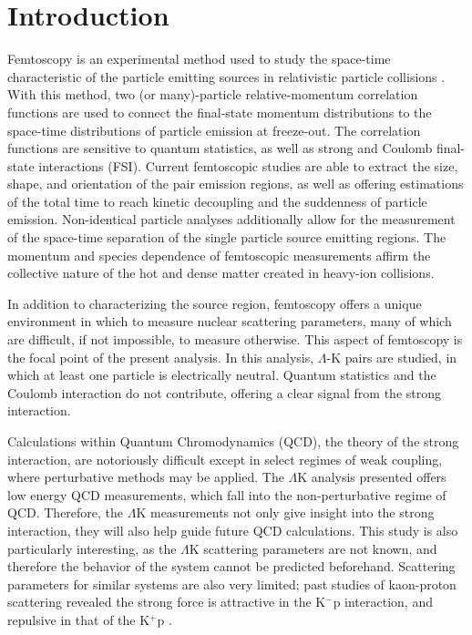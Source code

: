 \documentclass[ALICE,manyauthors]{cernphprep}
\newcommand{\Lam}{$\Lambda$\xspace}
\newcommand{\LamK}{$\Lambda$K\xspace}
\begin{document}
\section{Introduction}
\label{sec:Introduction}

Femtoscopy is an experimental method used to study the space-time characteristic of the particle emitting sources in relativistic particle collisions \cite{Lisa:2005dd}.  
With this method, two (or many)-particle relative-momentum correlation functions are used to connect the final-state momentum distributions to the space-time distributions of particle emission at freeze-out.  
The correlation functions are sensitive to quantum statistics, as well as strong and Coulomb final-state interactions (FSI).  
Current femtoscopic studies are able to extract the size, shape, and orientation of the pair emission regions, as well as offering estimations of the total time to reach kinetic decoupling and the suddenness of particle emission.
Non-identical particle analyses additionally allow for the measurement of the space-time separation of the single particle source emitting regions.
The momentum and species dependence of femtoscopic measurements affirm the collective nature of the hot and dense matter created in heavy-ion collisions.

In addition to characterizing the source region, femtoscopy offers a unique environment in which to measure nuclear scattering parameters, many of which are difficult, if not impossible, to measure otherwise.  
This aspect of femtoscopy is the focal point of the present analysis. 
In this analysis, \Lam-K pairs are studied, in which at least one particle is electrically neutral.  
Quantum statistics and the Coulomb interaction do not contribute, offering a clear signal from the strong interaction.

Calculations within Quantum Chromodynamics (QCD), the theory of the strong interaction, are notoriously difficult except in select regimes of weak coupling, where perturbative methods may be applied. 
The \LamK analysis presented offers low energy QCD measurements, which fall into the non-perturbative regime of QCD.
Therefore, the \LamK measurements not only give insight into the strong interaction, they will also help guide future QCD calculations.
This study is also particularly interesting, as the \LamK scattering parameters are not known, and therefore the behavior of the system cannot be predicted beforehand.
Scattering parameters for similar systems are also very limited; past studies of kaon-proton scattering revealed the strong force is attractive in the K$^{-}$p interaction, and repulsive in that of the K$^{+}$p \cite{Humphrey:1962zz, Hadjimichef:2002xe, Ikeda:2012au}.
\end{document}
